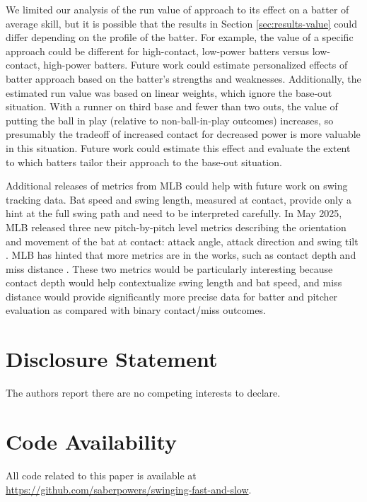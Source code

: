 \documentclass[
  12pt]{article}
\begin{document}
      We limited our analysis of the run value of approach to its effect on a batter of average skill, but it is possible that the results in Section \ref{sec:results-value} could differ depending on the profile of the batter. For example, the value of a specific approach could be different for high-contact, low-power batters versus low-contact, high-power batters. Future work could estimate personalized effects of batter approach based on the batter's strengths and weaknesses. Additionally, the estimated run value was based on linear weights, which ignore the base-out situation. With a runner on third base and fewer than two outs, the value of putting the ball in play (relative to non-ball-in-play outcomes) increases, so presumably the tradeoff of increased contact for decreased power is more valuable in this situation. Future work could estimate this effect and evaluate the extent to which batters tailor their approach to the base-out situation.

      Additional releases of metrics from MLB could help with future work on swing tracking data. Bat speed and swing length, measured at contact, provide only a hint at the full swing path and need to be interpreted carefully. In May 2025, MLB released three new pitch-by-pitch level metrics describing the orientation and movement of the bat at contact: attack angle, attack direction and swing tilt \citep{petriello_4_2025}. MLB has hinted that more metrics are in the works, such as contact depth and miss distance \citep{petriello_everything_2024}. These two metrics would be particularly interesting because contact depth would help contextualize swing length and bat speed, and miss distance would provide significantly more precise data for batter and pitcher evaluation as compared with binary contact/miss outcomes.

  \section*{Disclosure Statement}
  
    The authors report there are no competing interests to declare.

  \section*{Code Availability}

    All code related to this paper is available at \url{https://github.com/saberpowers/swinging-fast-and-slow}.
   
\end{document}
